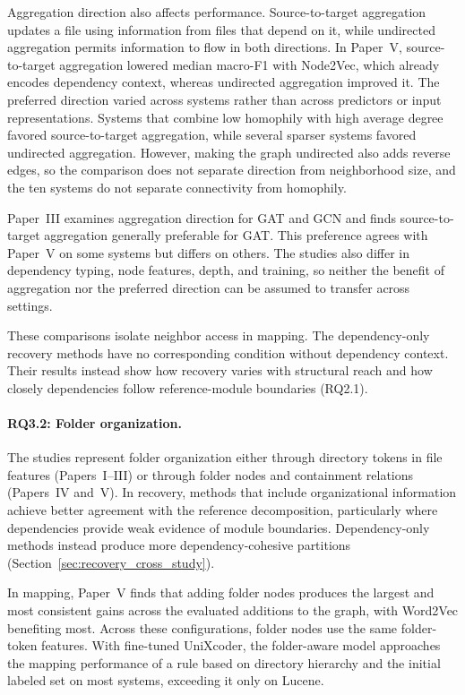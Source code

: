 Aggregation direction also affects performance. Source-to-target aggregation updates a file using information from files that depend on it, while undirected aggregation permits information to flow in both directions. In Paper~V, source-to-target aggregation lowered median macro-F1 with Node2Vec, which already encodes dependency context, whereas undirected aggregation improved it. The preferred direction varied across systems rather than across predictors or input representations. Systems that combine low homophily with high average degree favored source-to-target aggregation, while several sparser systems favored undirected aggregation. However, making the graph undirected also adds reverse edges, so the comparison does not separate direction from neighborhood size, and the ten systems do not separate connectivity from homophily.

Paper~III examines aggregation direction for GAT and GCN and finds source-to-target aggregation generally preferable for GAT. This preference agrees with Paper~V on some systems but differs on others. The studies also differ in dependency typing, node features, depth, and training, so neither the benefit of aggregation nor the preferred direction can be assumed to transfer across settings.

These comparisons isolate neighbor access in mapping. The dependency-only recovery methods have no corresponding condition without dependency context. Their results instead show how recovery varies with structural reach and how closely dependencies follow reference-module boundaries (RQ2.1).

\paragraph{RQ3.2: Folder organization.} The studies represent folder organization either through directory tokens in file features (Papers~I--III) or through folder nodes and containment relations (Papers~IV and~V). In recovery, methods that include organizational information achieve better agreement with the reference decomposition, particularly where dependencies provide weak evidence of module boundaries. Dependency-only methods instead produce more dependency-cohesive partitions (Section~\ref{sec:recovery_cross_study}).

In mapping, Paper~V finds that adding folder nodes produces the largest and most consistent gains across the evaluated additions to the graph, with Word2Vec benefiting most. Across these configurations, folder nodes use the same folder-token features. With fine-tuned UniXcoder, the folder-aware model approaches the mapping performance of a rule based on directory hierarchy and the initial labeled set on most systems, exceeding it only on Lucene.


